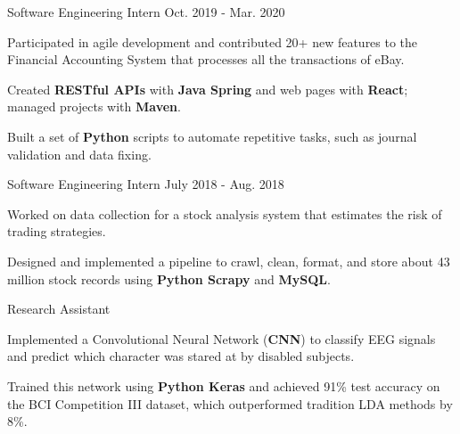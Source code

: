 \documentclass[12pt, a4paper]{yp-vita}
\begin{document}
    \smallskip

    {Software Engineering Intern}
    {Oct. 2019 - Mar. 2020}
    {
        \begin{cvitems}
            \item Participated in agile development and contributed 20+ new features to the Financial Accounting System that processes all the transactions of eBay.
            \item Created \textbf{RESTful APIs} with \textbf{Java Spring} and web pages with \textbf{React}; managed projects with \textbf{Maven}.
            \item Built a set of \textbf{Python} scripts to automate repetitive tasks, such as journal validation and data fixing.
        \end{cvitems}
    }

    \smallskip

    {Software Engineering Intern}
    {July 2018 - Aug. 2018}{
        \begin{cvitems}
            \item Worked on data collection for a stock analysis system that estimates the risk of trading strategies.
            \item Designed and implemented a pipeline to crawl, clean, format, and store about 43 million stock records using \textbf{Python Scrapy} and \textbf{MySQL}.
        \end{cvitems}
    }
    
    \vfill

    {Research Assistant}{}{
        \begin{cvitems}
            \item Implemented a Convolutional Neural Network (\textbf{CNN}) to classify EEG signals and predict which character was stared at by disabled subjects.
            \item Trained this network using \textbf{Python Keras} and achieved 91\% test accuracy on the BCI Competition III dataset, which outperformed tradition LDA methods by 8\%.
        \end{cvitems}
    }

    \smallskip

\end{document}
